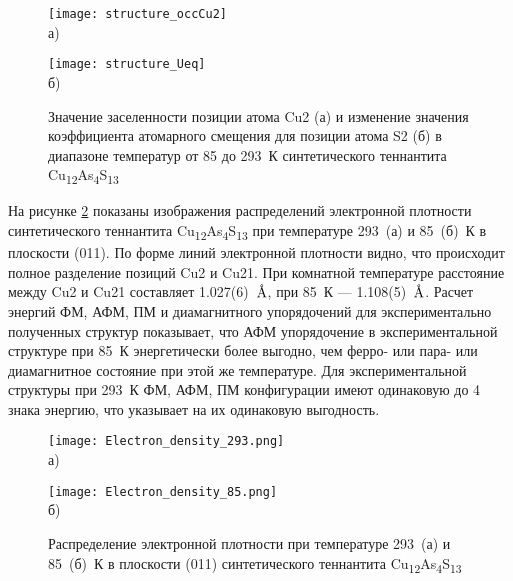 \begin{figure}[ht]
  \begin{minipage}[ht]{0.5\linewidth}\centering
    \texttt{[image: structure\_occCu2]} \\ а)
  \end{minipage}
  \hfill
  \begin{minipage}[ht]{0.5\linewidth}\centering
    \texttt{[image: structure\_Ueq]} \\ б)
  \end{minipage}

      \caption[Значение заселенности позиции атома Cu2 (а) и изменение значения коэффициента атомарного смещения для позиции атома S2 (б) в диапазоне температур от 85 до 293~К синтетического теннантита Cu\textsubscript{12}As\textsubscript{4}S\textsubscript{13}]{Значение заселенности позиции атома Cu2 (а) и изменение значения коэффициента атомарного смещения для позиции атома S2 (б) в диапазоне температур от 85 до 293~К синтетического теннантита Cu\textsubscript{12}As\textsubscript{4}S\textsubscript{13}}
    \label{img:xray}
\end{figure}

На рисунке \ref{img:xray2} показаны изображения распределений электронной плотности синтетического теннантита Cu\textsubscript{12}As\textsubscript{4}S\textsubscript{13} при температуре 293~(а) и 85~(б)~К в плоскости (011). По форме линий электронной плотности видно, что происходит полное разделение позиций Cu2 и Cu21. При комнатной температуре расстояние между Cu2 и Cu21 составляет 1.027(6)~$\mbox{\normalfont\AA}$, при 85~К --- 1.108(5)~$\mbox{\normalfont\AA}$. Расчет энергий ФМ, АФМ, ПМ и диамагнитного упорядочений для экспериментально полученных структур показывает, что АФМ упорядочение в экспериментальной структуре при 85~К энергетически более выгодно, чем ферро- или пара- или диамагнитное состояние при этой же температуре. Для экспериментальной структуры при 293~К ФМ, АФМ, ПМ конфигурации имеют одинаковую до 4 знака энергию, что указывает на их одинаковую выгодность.

\begin{figure}[ht]
  \begin{minipage}[ht]{0.5\linewidth}\centering
    \texttt{[image: Electron\_density\_293.png]} \\ а)
  \end{minipage}
  \hfill
  \begin{minipage}[ht]{0.5\linewidth}\centering
    \texttt{[image: Electron\_density\_85.png]} \\ б)
  \end{minipage}

      \caption[Распределение электронной плотности при температуре 293~(а) и 85~(б)~К в плоскости (011) синтетического теннантита Cu\textsubscript{12}As\textsubscript{4}S\textsubscript{13}]{Распределение электронной плотности при температуре 293~(а) и 85~(б)~К в плоскости (011) синтетического теннантита Cu\textsubscript{12}As\textsubscript{4}S\textsubscript{13}}
    \label{img:xray2}
\end{figure}


